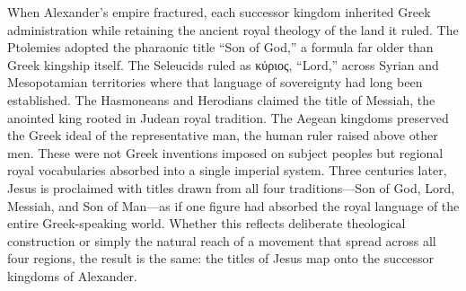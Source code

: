 When Alexander's empire fractured, each successor kingdom inherited Greek administration while retaining the ancient royal theology of the land it ruled.
The Ptolemies adopted the pharaonic title ``Son of God,'' a formula far older than Greek kingship itself.
The Seleucids ruled as κύριος, ``Lord,'' across Syrian and Mesopotamian territories where that language of sovereignty had long been established.
The Hasmoneans and Herodians claimed the title of Messiah, the anointed king rooted in Judean royal tradition.
The Aegean kingdoms preserved the Greek ideal of the representative man, the human ruler raised above other men.
These were not Greek inventions imposed on subject peoples but regional royal vocabularies absorbed into a single imperial system.
Three centuries later, Jesus is proclaimed with titles drawn from all four traditions---Son of God, Lord, Messiah, and Son of Man---as if one figure had absorbed the royal language of the entire Greek-speaking world.
Whether this reflects deliberate theological construction or simply the natural reach of a movement that spread across all four regions, the result is the same: the titles of Jesus map onto the successor kingdoms of Alexander.

